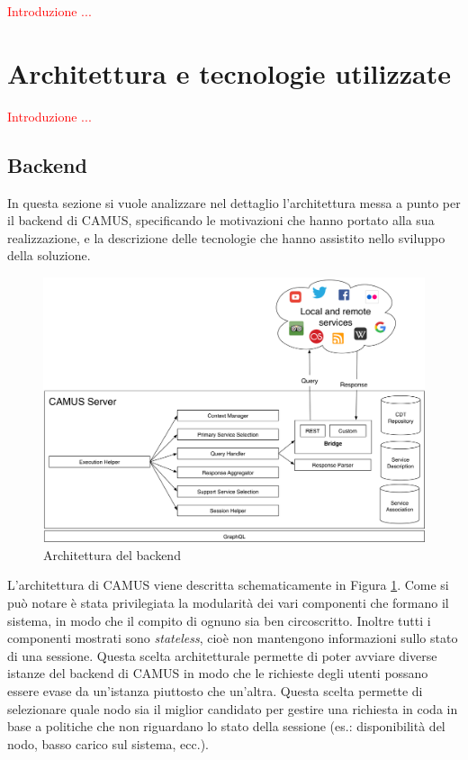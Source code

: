 \textcolor{red}{Introduzione ...}

\section{Architettura e tecnologie utilizzate}

\textcolor{red}{Introduzione ...}

\subsection{Backend\label{sec:architettura-backend}}

In questa sezione si vuole analizzare nel dettaglio l'architettura messa a punto per il backend di CAMUS, specificando le motivazioni che hanno portato alla sua realizzazione, e la descrizione delle tecnologie che hanno assistito nello sviluppo della soluzione.

\begin{figure}[ht]
	\centering
	\includegraphics[width=\textwidth]{4-progettazione-alto-livello/Immagini/camus-architecture-backend.png}
	\caption{Architettura del backend}\label{fig:architettura-backend}
\end{figure}

L'architettura di CAMUS viene descritta schematicamente in Figura \ref{fig:architettura-backend}. Come si può notare è stata privilegiata la modularità dei vari componenti che formano il sistema, in modo che il compito di ognuno sia ben circoscritto. Inoltre tutti i componenti mostrati sono \emph{stateless}, cioè non mantengono informazioni sullo stato di una sessione. Questa scelta architetturale permette di poter avviare diverse istanze del backend di CAMUS in modo che le richieste degli utenti possano essere evase da un'istanza piuttosto che un'altra. Questa scelta permette di selezionare quale nodo sia il miglior candidato per gestire una richiesta in coda in base a politiche che non riguardano lo stato della sessione (es.: disponibilità del nodo, basso carico sul sistema, ecc.).

